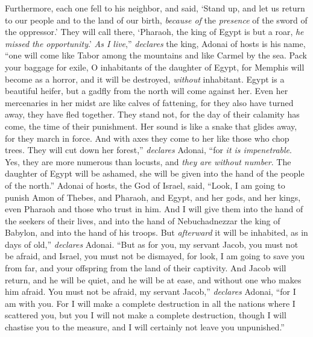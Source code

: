 \begin{biblechapter}
Furthermore, each one fell to his neighbor, 
and said, ‘Stand up, and let us return to our people 
and to the land of our birth, 
\textit{because of} the \textit{presence} of the sword of the oppressor.’
\verse They will call there, 
‘Pharaoh, the king of Egypt is but a roar, 
\textit{he missed the opportunity}.’
\verse \textit{As I live},” \textit{declares} the king, 
Adonai of hosts is his name, 
“one will come like Tabor among the mountains 
and like Carmel by the sea.
\verse Pack your baggage for exile, 
O inhabitants of the daughter of Egypt, 
for Memphis will become as a horror, 
and it will be destroyed, \textit{without} inhabitant.
\verse Egypt is a beautiful heifer, 
but a gadfly from the north will come against her.
\verse Even her mercenaries in her midst are like calves of fattening, 
for they also have turned away, 
they have fled together. 
They stand not, 
for the day of their calamity has come, 
the time of their punishment.
\verse Her sound is like a snake that glides away, 
for they march in force. 
And with axes they come to her 
like those who chop trees.
\verse They will cut down her forest,” \textit{declares} Adonai, 
“for \textit{it is impenetrable}. 
Yes, they are more numerous than locusts, 
and \textit{they are without number}.
\verse The daughter of Egypt will be ashamed, 
she will be given into the hand of the people of the north.”
\verse Adonai of hosts, the God of Israel, said, “Look, I am going to punish Amon of Thebes, and Pharaoh, and Egypt, and her gods, and her kings, even Pharaoh and those who trust in him.
\verse And I will give them into the hand of the seekers of their lives, and into the hand of Nebuchadnezzar the king of Babylon, and into the hand of his troops. But \textit{afterward} it will be inhabited, as in days of old,” \textit{declares} Adonai.
\verse “But as for you, my servant Jacob, you must not be afraid, 
and Israel, you must not be dismayed, 
for look, I am going to save you from far, 
and your offspring from the land of their captivity. 
And Jacob will return, 
and he will be quiet, 
and he will be at ease, 
and without one who makes him afraid.
\verse You must not be afraid, my servant Jacob,” \textit{declares} Adonai, 
“for I am with you. 
For I will make a complete destruction in all the nations where I scattered you, 
but you I will not make a complete destruction, 
though I will chastise you to the measure, 
and I will certainly not leave you unpunished.”
\end{biblechapter}

